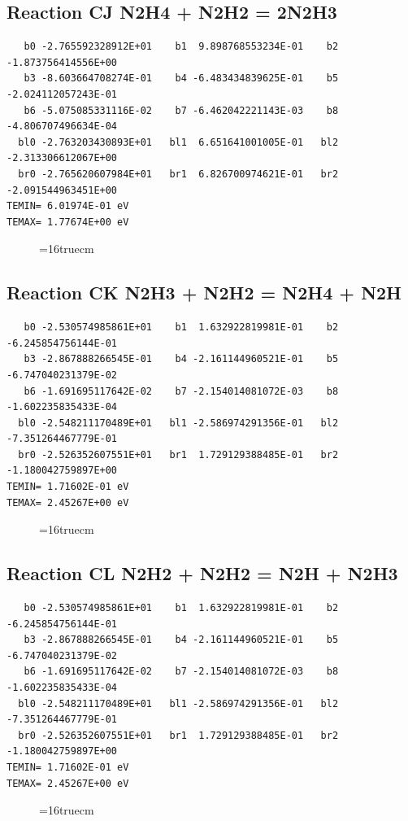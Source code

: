 \documentclass[12pt,dvipdfm]{article}
\begin{document}
\subsection{
Reaction CJ N2H4 + N2H2  =  2N2H3 }
\begin{small}\begin{verbatim}
   b0 -2.765592328912E+01    b1  9.898768553234E-01    b2 -1.873756414556E+00
   b3 -8.603664708274E-01    b4 -6.483434839625E-01    b5 -2.024112057243E-01
   b6 -5.075085331116E-02    b7 -6.462042221143E-03    b8 -4.806707496634E-04
  bl0 -2.763203430893E+01   bl1  6.651641001005E-01   bl2 -2.313306612067E+00
  br0 -2.765620607984E+01   br1  6.826700974621E-01   br2 -2.091544963451E+00
TEMIN= 6.01974E-01 eV
TEMAX= 1.77674E+00 eV
   \end{verbatim}\end{small}
\begin{figure}[h!]
\label{n2rates}
\epsfxsize=16truecm
\end{figure}
\newpage

\subsection{
Reaction CK N2H3 + N2H2  = N2H4 + N2H}
\begin{small}\begin{verbatim}
   b0 -2.530574985861E+01    b1  1.632922819981E-01    b2 -6.245854756144E-01
   b3 -2.867888266545E-01    b4 -2.161144960521E-01    b5 -6.747040231379E-02
   b6 -1.691695117642E-02    b7 -2.154014081072E-03    b8 -1.602235835433E-04
  bl0 -2.548211170489E+01   bl1 -2.586974291356E-01   bl2 -7.351264467779E-01
  br0 -2.526352607551E+01   br1  1.729129388485E-01   br2 -1.180042759897E+00
TEMIN= 1.71602E-01 eV
TEMAX= 2.45267E+00 eV
   \end{verbatim}\end{small}
\begin{figure}[h!]
\label{n2rates}
\epsfxsize=16truecm
\end{figure}
\newpage

\subsection{
Reaction CL N2H2 + N2H2  = N2H + N2H3}
\begin{small}\begin{verbatim}
   b0 -2.530574985861E+01    b1  1.632922819981E-01    b2 -6.245854756144E-01
   b3 -2.867888266545E-01    b4 -2.161144960521E-01    b5 -6.747040231379E-02
   b6 -1.691695117642E-02    b7 -2.154014081072E-03    b8 -1.602235835433E-04
  bl0 -2.548211170489E+01   bl1 -2.586974291356E-01   bl2 -7.351264467779E-01
  br0 -2.526352607551E+01   br1  1.729129388485E-01   br2 -1.180042759897E+00
TEMIN= 1.71602E-01 eV
TEMAX= 2.45267E+00 eV
   \end{verbatim}\end{small}
\begin{figure}[h!]
\label{n2rates}
\epsfxsize=16truecm
\end{figure}
\newpage
\end{document}
